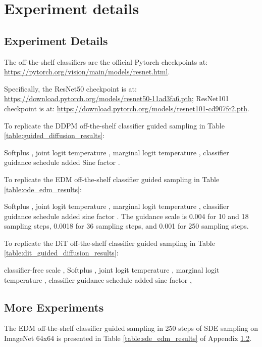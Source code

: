 \documentclass{article}
\theoremstyle{definition}
\begin{document}
\section{Experiment details}\label{appendix:experiment_details}


\subsection{Experiment Details}\label{appendix:parameter_settings}
The off-the-shelf classifiers are the official Pytorch checkpoints at: \url{https://pytorch.org/vision/main/models/resnet.html}. 

Specifically, the ResNet50 checkpoint is at:  
\url{https://download.pytorch.org/models/resnet50-11ad3fa6.pth}; ResNet101 checkpoint is at:
\url{https://download.pytorch.org/models/resnet101-cd907fc2.pth}.

To replicate the DDPM off-the-shelf classifier guided sampling in Table \ref{table:guided_diffusion_results}:

Softplus , joint logit temperature , marginal logit temperature , classifier guidance schedule added Sine factor . 

To replicate the EDM off-the-shelf classifier guided sampling in Table \ref{table:ode_edm_results}:

Softplus , joint logit temperature , marginal logit temperature , classifier guidance schedule added sine factor . The guidance scale is 0.004 for 10 and 18 sampling steps, 0.0018 for 36 sampling steps, and 0.001 for 250 sampling steps. 


To replicate the DiT off-the-shelf classifier guided sampling in Table \ref{table:dit_guided_diffusion_results}:

classifier-free scale , Softplus , joint logit temperature , marginal logit temperature , classifier guidance schedule added sine factor ,


\subsection{More Experiments}\label{appendix:more_experiment}

The EDM off-the-shelf classifier guided sampling in 250 steps of SDE sampling on ImageNet 64x64 \cite{kingma2023variational} is presented in Table \ref{table:sde_edm_results} of Appendix \ref{appendix:more_experiment}. 
\end{document}
